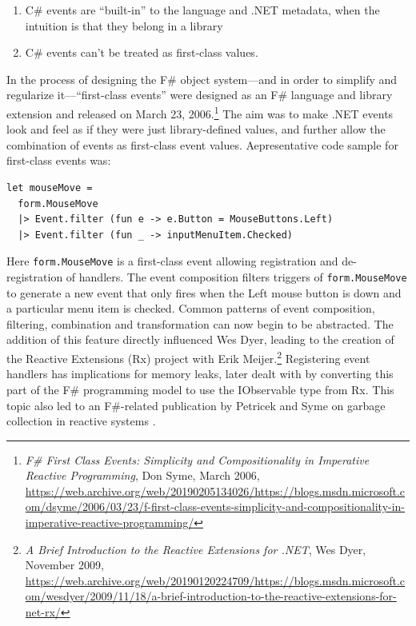 \documentclass[acmsmall]{acmart}\settopmatter{}
\begin{document}
\begin{enumerate}
\item C\# events are “built-in” to the language and .NET metadata, when the intuition is that they belong in a library
\item C\# events can’t be treated as first-class values.  
\end{enumerate}

In the process of designing the F\# object system---and in order to simplify and regularize it---“first-class events” were designed as an F\# language and library extension and released on March 23, 2006.\footnote{\textit{F\# First Class Events: Simplicity and Compositionality in Imperative Reactive Programming}, Don Syme, March 2006,  \url{https://web.archive.org/web/20190205134026/https://blogs.msdn.microsoft.com/dsyme/2006/03/23/f-first-class-events-simplicity-and-compositionality-in-imperative-reactive-programming/}}  The aim was to make .NET events look and feel as if they were just library-defined values, and further allow the combination of events as first-class event values. Aepresentative code sample for first-class events was:

\begin{verbatim}
let mouseMove = 
  form.MouseMove 
  |> Event.filter (fun e -> e.Button = MouseButtons.Left)
  |> Event.filter (fun _ -> inputMenuItem.Checked)
\end{verbatim}

Here \texttt{form.MouseMove} is a first-class event allowing registration and de-registration of handlers.  The event composition filters triggers of \texttt{form.MouseMove} to generate a new event that only fires when the Left mouse button is down and a particular menu item is checked.  Common patterns of event composition, filtering, combination and transformation can now begin to be abstracted.  The addition of this feature directly influenced Wes Dyer, leading to the creation of the Reactive Extensions (Rx) project with Erik Meijer.\footnote{\textit{A Brief Introduction to the Reactive Extensions for .NET}, Wes Dyer, November 2009, \url{https://web.archive.org/web/20190120224709/https://blogs.msdn.microsoft.com/wesdyer/2009/11/18/a-brief-introduction-to-the-reactive-extensions-for-net-rx/}}  Registering event handlers has implications for memory leaks, later dealt with by converting this part of the F\# programming model to use the IObservable type from Rx.  This topic also led to an F\#-related publication by Petricek and Syme on garbage collection in reactive systems \citep{Petricek2010}.
\end{document}
